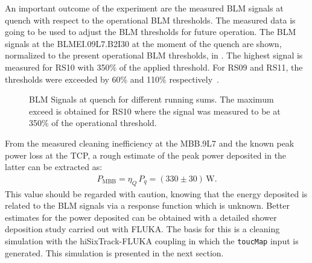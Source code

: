 \newpage

An important outcome of the experiment are the measured BLM signals at quench with respect to the operational BLM thresholds. The measured data is going to be used to adjust the BLM thresholds for future operation. The BLM signals at the BLMEI.09L7.B2I30 at the moment of the quench are shown, normalized to the present operational BLM thresholds, in . The highest signal is measured for RS10 with 350\% of the applied threshold. For RS09 and RS11, the thresholds were exceeded by 60\% and 110\% respectively~\cite{ACC-NOTE-16-0031}. 


\begin{figure}[t]
  \centering
  \caption{BLM Signals at quench for different running sums. The maximum exceed is obtained for RS10 where the signal was measured to be at 350\% of the operational threshold.}  
  \label{pic:16071403}
  \end{figure}



From the measured cleaning inefficiency at the MBB.9L7 and the known peak power loss at the TCP, a rough estimate of the peak power deposited in the latter can be extracted as:
%
\begin{align}
  P_\text{MBB} = \eta_Q \, P_q = (330 \pm 30)\,\text{W}. 
\end{align}
%
This value should be regarded with caution, knowing that the energy deposited is related to the BLM signals via a response function which is unknown. Better estimates for the power deposited can be obtained with a detailed shower deposition study carried out with FLUKA. The basis for this is a cleaning simulation with the hiSixTrack-FLUKA coupling in which the \texttt{toucMap} input is generated. This simulation is presented in the next section.


